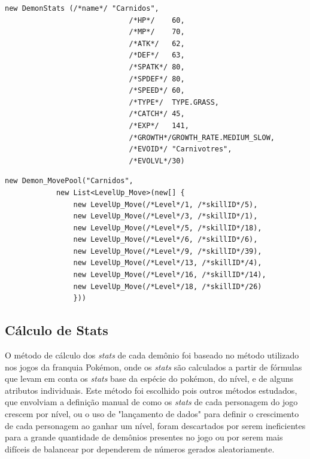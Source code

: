 	
\begin{lstlisting}
new DemonStats (/*name*/ "Carnidos",
                             /*HP*/    60,
                             /*MP*/    70, 
                             /*ATK*/   62, 
                             /*DEF*/   63, 
                             /*SPATK*/ 80, 
                             /*SPDEF*/ 80, 
                             /*SPEED*/ 60,
                             /*TYPE*/  TYPE.GRASS,
                             /*CATCH*/ 45,
                             /*EXP*/   141,
                             /*GROWTH*/GROWTH_RATE.MEDIUM_SLOW,
                             /*EVOID*/ "Carnivotres",
                             /*EVOLVL*/30)
\end{lstlisting}

\begin{lstlisting}
new Demon_MovePool("Carnidos", 
            new List<LevelUp_Move>(new[] {
                new LevelUp_Move(/*Level*/1, /*skillID*/5),
                new LevelUp_Move(/*Level*/3, /*skillID*/1),
                new LevelUp_Move(/*Level*/5, /*skillID*/18),
                new LevelUp_Move(/*Level*/6, /*skillID*/6),
                new LevelUp_Move(/*Level*/9, /*skillID*/39),
                new LevelUp_Move(/*Level*/13, /*skillID*/4),
                new LevelUp_Move(/*Level*/16, /*skillID*/14),
                new LevelUp_Move(/*Level*/18, /*skillID*/26)
                }))
\end{lstlisting}

\subsection{Cálculo de Stats}\label{chap:Stats}

	O método de cálculo dos \emph{stats} de cada demônio foi baseado no método utilizado nos jogos da franquia Pokémon, onde os \emph{stats} são calculados a partir de fórmulas que levam em conta os \emph{stats} base da espécie do pokémon, do nível, e de alguns atributos individuais. Este método foi escolhido pois outros métodos estudados, que envolviam a definição manual de como os \emph{stats} de cada personagem do jogo crescem por nível, ou o uso de "lançamento de dados" para definir o crescimento de cada personagem ao ganhar um nível, foram descartados por serem ineficientes para a grande quantidade de demônios presentes no jogo ou por serem mais difíceis de balancear por dependerem de números gerados aleatoriamente.
	
